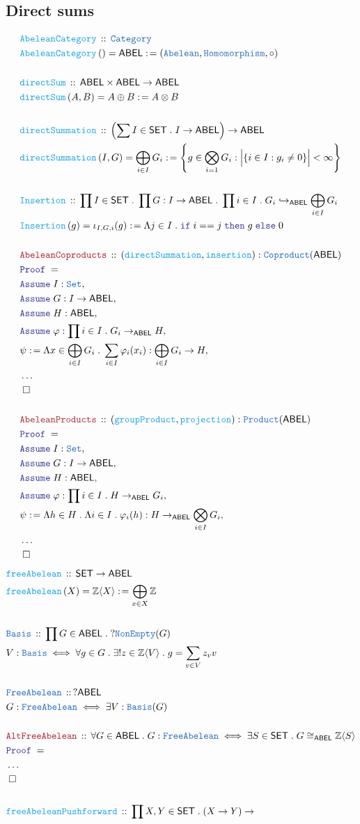 \documentclass[12pt]{scrartcl}
\newcommand{\TYPE}[1]{\textcolor{NavyBlue}{\mathtt{#1}}}
\newcommand{\FUNC}[1]{\textcolor{Cerulean}{\mathtt{#1}}}
\newcommand{\LOGIC}[1]{\textcolor{Blue}{\mathtt{#1}}}
\newcommand{\THM}[1]{\textcolor{Maroon}{\mathtt{#1}}}
\renewcommand{\.}{\; . \;}
\newcommand{\de}{: \kern 0.1pc =}
\newcommand{\If}{\LOGIC{if} \;}
\newcommand{\Then}{ \; \LOGIC{then} \;}
\newcommand{\Else}{\; \LOGIC{else} \;}
\newcommand{\Act}[1]{\left( #1 \right)}
\newcommand{\Theorem}[2]{& \THM{#1} \, :: \, #2 \\ & \Proof = \\ }
\newcommand{\DeclareType}[2]{& \TYPE{#1} \, :: \, #2 \\}
\newcommand{\DefineType}[3]{& #1 : \TYPE{#2} \iff #3 \\}
\newcommand{\DeclareFunc}[2]{& \FUNC{#1} \, :: \, #2 \\}
\newcommand{\DefineNamedFunc}[4]{&  \FUNC{#1}\Act{#2} = #3 \de #4 \\}
\newcommand{\Page}[1]{ \begin{align*} #1 \end{align*}   }
\newcommand{\NoProof}{ & \ldots \\ \EndProof}
\newcommand{\Int}{\mathbb{Z} }
\newcommand{\Cat}{\TYPE{Category}}
\newcommand{\ToInj}{\hookrightarrow}
\newcommand{\Set}{\TYPE{Set}}
\newcommand{\Say}[3]{& #1 \de #2 : #3, \\}
\newcommand{\Assume}[2]{& \LOGIC{Assume} \; #1 : #2, \\}
\newcommand{\QED}{\; \square}
\newcommand{\EndProof}{& \QED \\}
\newcommand{\Proof}{\LOGIC{Proof} \; }
\newcommand{\SET}{\mathsf{SET}}
\newcommand{\Abel}{\TYPE{Abelean}}
\newcommand{\ABEL}{\mathsf{ABEL}}
\begin{document}
\subsection{Direct sums}
\Page{	
	\DeclareFunc{AbeleanCategory}{\Cat}
	\DefineNamedFunc{AbeleanCategory}{}{\ABEL}{(\Abel,\TYPE{Homomorphism},\circ)}
	\\
	\DeclareFunc{directSum}{\ABEL \times \ABEL \to \ABEL}
	\DefineNamedFunc{directSum}{A,B}{A \oplus B}{A \otimes B}
	\\
	\DeclareFunc{directSummation}{ \left(\sum I \in \SET \. I \to \ABEL \right) \to \ABEL}
	\DefineNamedFunc{directSummation}{I,G}{\bigoplus_{i \in I} G_i}{  
		\left\{ g \in \bigotimes_{i=1}  G_i : \Big|\{ i \in I : g_i \neq 0 \}\Big| < \infty   \right\}  }
	\\
	\DeclareFunc{Insertion}{ \prod  I \in \SET \. \prod G : I \to \ABEL \. \prod i \in I \. G_i \ToInj_{\ABEL} 
		\bigoplus_{i \in I} G_i }
	\DefineNamedFunc{Insertion}{g}{\iota_{I,G,i}(g)}{ \Lambda j \in I \. \If i == j \Then g \Else 0} 
	\\
	\Theorem{AbeleanCoproducts}{  (\FUNC{directSummation},\FUNC{insertion}) : \TYPE{Coproduct}(\ABEL)  }
	\Assume{I}{\Set}
	\Assume{G}{I \to \ABEL}
	\Assume{H}{\ABEL}
	\Assume{\varphi}{\prod i \in I \. G_i \to_{\ABEL} H}
	\Say{\psi}{\Lambda x \in \bigoplus_{i \in I} G_i \.  \sum_{i \in I } \varphi_i(x_i)}{\bigoplus_{i \in I}  G_i \to H}
	\NoProof
	\\
	\Theorem{AbeleanProducts}{(\FUNC{groupProduct},\FUNC{projection}) : \TYPE{Product}(\ABEL)}
	\Assume{I}{\Set}
	\Assume{G}{I \to \ABEL}
	\Assume{H}{\ABEL}
	\Assume{\varphi}{\prod i \in I \. H \to_{\ABEL} G_i}
	\Say{\psi}{\Lambda h \in H \. \Lambda i \in I \. \varphi_{i}(h)}{ H \to_{\ABEL} \bigotimes_{i \in I} G_i}
	\NoProof
}\Page{
	\DeclareFunc{freeAbelean}{\SET \to \ABEL}
	\DefineNamedFunc{freeAbelean}{X}{\Int\langle X \rangle}{\bigoplus_{x \in X} \Int} 
	\\
	\DeclareType{Basis}{ \prod G \in \ABEL \. ?\TYPE{NonEmpty}(G)}
	\DefineType{V}{Basis}{\forall g \in G \. \exists! z \in \Int\langle V \rangle \. g = \sum_{v \in V} z_v v }
	\\
	\DeclareType{FreeAbelean}{?\ABEL}
	\DefineType{G}{FreeAbelean}{\exists V : \TYPE{Basis}(G)}
	\\
	\Theorem{AltFreeAbelean}{ \forall G \in \ABEL \. G : \TYPE{FreeAbelean} \iff \exists S \in \SET \. 
	G \cong_{\ABEL} \Int\langle S \rangle}
	\NoProof
	\\
	\DeclareFunc{freeAbeleanPushforward}{ \prod X,Y \in \SET \. (X \to Y) \to \
}}
\end{document}
